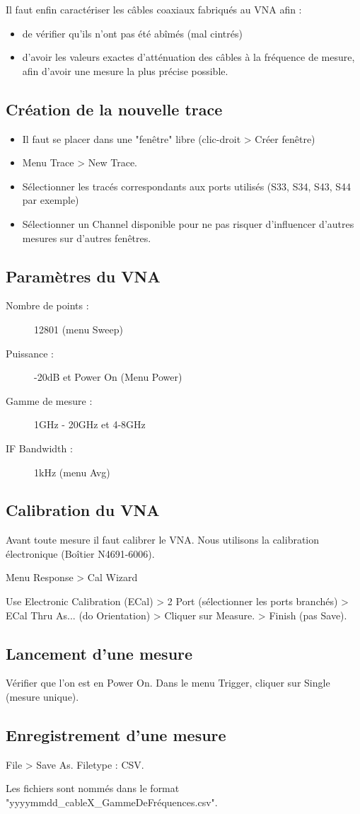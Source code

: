 Il faut enfin caractériser les câbles coaxiaux fabriqués au VNA afin :
\begin{itemize}
    \item de vérifier qu'ils n'ont pas été abîmés (mal cintrés)
    \item d'avoir les valeurs exactes d'atténuation des câbles à la fréquence de mesure, afin d'avoir une mesure la plus précise possible.
\end{itemize}

\subsection{Création de la nouvelle trace}
\begin{itemize}
    \item Il faut se placer dans une "fenêtre" libre (clic-droit > Créer fenêtre)
    \item Menu Trace > New Trace.
    \item Sélectionner les tracés correspondants aux ports utilisés (S33, S34, S43, S44 par exemple)
    \item Sélectionner un Channel disponible pour ne pas risquer d'influencer d'autres mesures sur d'autres fenêtres.
\end{itemize}

\subsection{Paramètres du VNA}
\begin{description}
    \item[Nombre de points :] 12801 (menu Sweep)
    \item[Puissance :] -20dB et Power On (Menu Power)
    \item[Gamme de mesure :] 1GHz - 20GHz et 4-8GHz
    \item[IF Bandwidth :] 1kHz (menu Avg)
\end{description}

\subsection{Calibration du VNA}
Avant toute mesure il faut calibrer le VNA. Nous utilisons la calibration électronique (Boîtier N4691-6006).

Menu Response > Cal Wizard

Use Electronic Calibration (ECal) > 2 Port (sélectionner les ports branchés) > ECal Thru As... (do Orientation) > Cliquer sur Measure. > Finish (pas Save).

\subsection{Lancement d'une mesure}
Vérifier que l'on est en Power On. Dans le menu Trigger, cliquer sur Single (mesure unique).

\subsection{Enregistrement d'une mesure}
File > Save As. Filetype : CSV.

Les fichiers sont nommés dans le format "yyyymmdd_cableX_GammeDeFréquences.csv".
